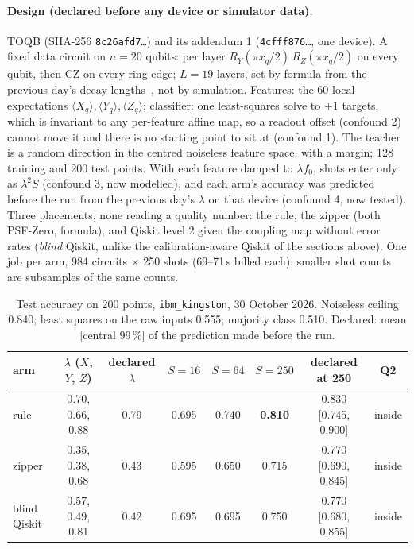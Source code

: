 \documentclass[11pt]{article}
\begin{document}
\paragraph{Design (declared before any device or simulator data).} TOQB 
(SHA-256 \texttt{8c26afd7\ldots}) and its addendum 1 (\texttt{4cfff876\ldots}, one device). A fixed data circuit on
$n = 20$ qubits: per layer $R_Y(\pi x_q/2)\,R_Z(\pi x_q/2)$ on every qubit, then CZ on every ring edge; $L = 19$
layers, set by formula from the previous day's decay lengths~\cite{paper5}, not by simulation. Features: the 60 local
expectations $\langle X_q\rangle,\langle Y_q\rangle,\langle Z_q\rangle$; classifier: one least-squares solve to $\pm1$ targets,
which is invariant to any per-feature affine map, so a readout offset (confound 2) cannot move it and there is no
starting point to sit at (confound 1). The teacher is a random direction in the centred noiseless feature space,
with a margin; 128 training and 200 test points. With each feature damped to $\lambda f_0$, shots enter only as
$\lambda^2S$ (confound 3, now modelled), and each arm's accuracy was predicted before the run from the previous day's
$\lambda$ on that device (confound 4, now tested). Three placements, none reading a quality number: the rule, the
zipper (both PSF-Zero, formula), and Qiskit level 2 given the coupling map without error rates (\emph{blind} Qiskit,
unlike the calibration-aware Qiskit of the sections above). One job per arm, 984 circuits $\times$ 250 shots
(69--71\,s billed each); smaller shot counts are subsamples of the same counts.

\begin{table}[h]
\centering
\small
\begin{tabular}{lccccccc}
\toprule
arm & $\lambda$ ($X$, $Y$, $Z$) & declared $\lambda$ & $S=16$ & $S=64$ & $S=250$ & declared at 250 & Q2\\
\midrule
rule & 0.70, 0.66, 0.88 & 0.79 & 0.695 & 0.740 & \textbf{0.810} & 0.830 [0.745, 0.900] & inside\\
zipper & 0.35, 0.38, 0.68 & 0.43 & 0.595 & 0.650 & 0.715 & 0.770 [0.690, 0.845] & inside\\
blind Qiskit & 0.57, 0.49, 0.81 & 0.42 & 0.695 & 0.695 & 0.750 & 0.770 [0.680, 0.855] & inside\\
\bottomrule
\end{tabular}
\caption{Test accuracy on 200 points, \texttt{ibm\_kingston}, 30 October 2026. Noiseless ceiling 0.840; least squares on
the raw inputs 0.555; majority class 0.510. Declared: mean [central 99\,\%] of the prediction made before the run.}
\label{tab:qelm}
\end{table}
\end{document}
